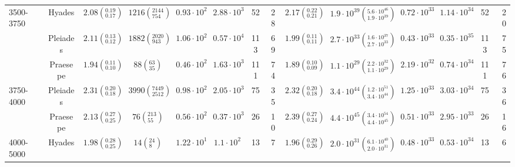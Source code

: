 \begin{tabular}{lccccccccccccr}
3500-3750 & Hyades &  $2.08\left(^{0.19}_{0.17}\right)$ &    $1216\left(^{2144}_{754}\right)$ &    $0.93\cdot 10^{2}$ &    $2.88\cdot 10^{3}$ &                  52 &                  28 &  $2.17\left(^{0.22}_{0.21}\right)$ &  $1.9 \cdot 10^{39}\left(^{5.6 \cdot 10^{46}}_{1.9 \cdot 10^{39}}\right)$ &       $0.72\cdot 10^{33}$ &       $1.14\cdot 10^{34}$ &                    52 &                    20 \\
          & Pleiades &  $2.11\left(^{0.13}_{0.12}\right)$ &    $1882\left(^{2020}_{943}\right)$ &    $1.06\cdot 10^{2}$ &    $0.57\cdot 10^{4}$ &                 113 &                  69 &  $1.99\left(^{0.11}_{0.11}\right)$ &  $2.7 \cdot 10^{33}\left(^{1.6 \cdot 10^{37}}_{2.7 \cdot 10^{33}}\right)$ &       $0.43\cdot 10^{33}$ &       $0.35\cdot 10^{35}$ &                   113 &                    75 \\
          & Praesepe &  $1.94\left(^{0.11}_{0.10}\right)$ &         $88\left(^{63}_{35}\right)$ &    $0.46\cdot 10^{2}$ &    $1.63\cdot 10^{3}$ &                 111 &                  74 &  $1.89\left(^{0.10}_{0.09}\right)$ &  $1.1 \cdot 10^{29}\left(^{2.2 \cdot 10^{32}}_{1.1 \cdot 10^{29}}\right)$ &       $2.19\cdot 10^{32}$ &       $0.74\cdot 10^{34}$ &                   111 &                    76 \\
3750-4000 & Pleiades &  $2.31\left(^{0.20}_{0.18}\right)$ &   $3990\left(^{7449}_{2512}\right)$ &    $0.98\cdot 10^{2}$ &    $2.05\cdot 10^{3}$ &                  75 &                  35 &  $2.32\left(^{0.20}_{0.18}\right)$ &  $3.4 \cdot 10^{44}\left(^{1.2 \cdot 10^{51}}_{3.4 \cdot 10^{44}}\right)$ &       $1.25\cdot 10^{33}$ &       $3.03\cdot 10^{34}$ &                    75 &                    36 \\
          & Praesepe &  $2.13\left(^{0.27}_{0.25}\right)$ &        $76\left(^{213}_{55}\right)$ &    $0.56\cdot 10^{2}$ &    $0.37\cdot 10^{3}$ &                  26 &                  10 &  $2.39\left(^{0.27}_{0.24}\right)$ &  $4.4 \cdot 10^{45}\left(^{3.4 \cdot 10^{54}}_{4.4 \cdot 10^{45}}\right)$ &       $0.51\cdot 10^{33}$ &       $2.95\cdot 10^{33}$ &                    26 &                    16 \\
4000-5000 & Hyades &  $1.98\left(^{0.28}_{0.25}\right)$ &          $14\left(^{24}_{8}\right)$ &    $1.22\cdot 10^{1}$ &     $1.1\cdot 10^{2}$ &                  13 &                   7 &  $1.96\left(^{0.29}_{0.26}\right)$ &      $2.0 \cdot 10^{31}\left(^{6.1 \cdot 10^{40}}_{2.0 \cdot 10^{31}}\right)$ &       $0.48\cdot 10^{33}$ &       $0.53\cdot 10^{34}$ &                    13 &                     6 \\

\end{tabular}
